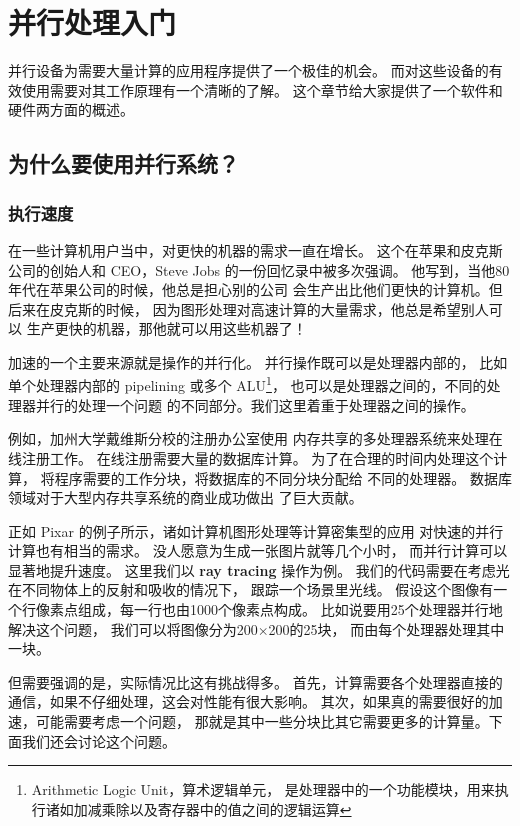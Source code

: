 \chapter{并行处理入门}
\label{chap:intro}

并行设备为需要大量计算的应用程序提供了一个极佳的机会。
而对这些设备的有效使用需要对其工作原理有一个清晰的了解。
这个章节给大家提供了一个软件和硬件两方面的概述。

\section{为什么要使用并行系统？}

\subsection{执行速度}

在一些计算机用户当中，对更快的机器的需求一直在增长。
这个在苹果和皮克斯公司的创始人和 CEO，Steve Jobs 的一份回忆录中被多次强调。
他写到，当他80年代在苹果公司的时候，他总是担心别的公司
会生产出比他们更快的计算机。但后来在皮克斯的时候，
因为图形处理对高速计算的大量需求，他总是希望别人可以
生产更快的机器，那他就可以用这些机器了！

加速的一个主要来源就是操作的并行化。
并行操作既可以是处理器内部的，
比如单个处理器内部的 pipelining 或多个 ALU\footnote{Arithmetic Logic Unit，算术逻辑单元，
是处理器中的一个功能模块，用来执行诸如加减乘除以及寄存器中的值之间的逻辑运算}，
也可以是处理器之间的，不同的处理器并行的处理一个问题
的不同部分。我们这里着重于处理器之间的操作。

例如，加州大学戴维斯分校的注册办公室使用
内存共享的多处理器系统来处理在线注册工作。
在线注册需要大量的数据库计算。
为了在合理的时间内处理这个计算，
将程序需要的工作分块，将数据库的不同分块分配给
不同的处理器。
数据库领域对于大型内存共享系统的商业成功做出
了巨大贡献。

正如 Pixar 的例子所示，诸如计算机图形处理等计算密集型的应用
对快速的并行计算也有相当的需求。
没人愿意为生成一张图片就等几个小时，
而并行计算可以显著地提升速度。
这里我们以 \textbf{ray tracing} 操作为例。
我们的代码需要在考虑光在不同物体上的反射和吸收的情况下，
跟踪一个场景里光线。
假设这个图像有一个行像素点组成，每一行也由1000个像素点构成。
比如说要用25个处理器并行地解决这个问题，
我们可以将图像分为200$\times$200的25块，
而由每个处理器处理其中一块。

但需要强调的是，实际情况比这有挑战得多。
首先，计算需要各个处理器直接的通信，如果不仔细处理，这会对性能有很大影响。
其次，如果真的需要很好的加速，可能需要考虑一个问题，
那就是其中一些分块比其它需要更多的计算量。下面我们还会讨论这个问题。

